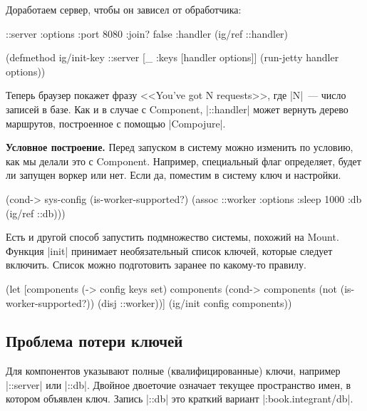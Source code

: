 Доработаем сервер, чтобы он зависел от обработчика:

\begin{english}
  \begin{clojure}
{::server {:options {:port 8080 :join? false}
           :handler (ig/ref ::handler)}}

(defmethod ig/init-key ::server
  [_ {:keys [handler options]}]
  (run-jetty handler options))
  \end{clojure}
\end{english}

Теперь браузер покажет фразу <<You've got N requests>>, где \spverb|N|~--- число
записей в базе. Как и в случае с Component, \spverb|::handler| может
вернуть дерево маршрутов, построенное с помощью \spverb|Compojure|.

\textbf{Условное построение.} Перед запуском в систему можно изменить по
условию, как мы делали это с Component. Например, специальный флаг
определяет, будет ли запущен воркер или нет. Если да, поместим в систему ключ и
настройки.

\begin{english}
  \begin{clojure}
(cond-> sys-config
  (is-worker-supported?)
  (assoc ::worker {:options {:sleep 1000}
                   :db (ig/ref ::db)}))
  \end{clojure}
\end{english}

Есть и другой способ запустить подмножество системы, похожий на
Mount. Функция \spverb|init| принимает необязательный список ключей,
которые следует включить. Список можно подготовить заранее по какому-то правилу.

\begin{english}
  \begin{clojure}
(let [components (-> config keys set)
      components (cond-> components
                   (not (is-worker-supported?))
                   (disj ::worker))]
  (ig/init config components))
  \end{clojure}
\end{english}

\subsection{Проблема потери ключей}

Для компонентов указывают полные (квалифицированные) ключи, например
\spverb|::server| или \spverb|::db|. Двойное двоеточие означает текущее
пространство имен, в котором объявлен ключ. Запись \spverb|::db| это краткий
вариант \spverb|:book.integrant/db|.

